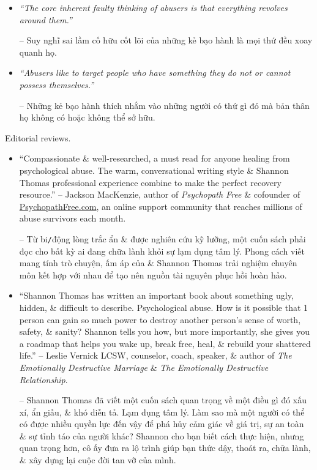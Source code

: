 \documentclass{article}
\begin{document}
\begin{enumerate}
\begin{itemize}
		\item {\it``The core inherent faulty thinking of abusers is that everything revolves around them.''}		
		
		-- Suy nghĩ sai lầm cố hữu cốt lõi của những kẻ bạo hành là mọi thứ đều xoay quanh họ.
		
		\item {\it``Abusers like to target people who have something they do not or cannot possess themselves.''}
		
		-- Những kẻ bạo hành thích nhắm vào những người có thứ gì đó mà bản thân họ không có hoặc không thể sở hữu.
	\end{itemize}
	{\sf Editorial reviews.}
	\begin{itemize}
		\item ``Compassionate \& well-researched, a must read for anyone healing from psychological abuse. The warm, conversational writing style \& {\sc Shannon Thomas} professional experience combine to make the perfect recovery resource.'' -- {\sc Jackson MacKenzie}, author of {\it Psychopath Free} \& cofounder of \url{PsychopathFree.com}, an online support community that reaches millions of abuse survivors each month.
		
		-- Từ bi{\tt/}động lòng trắc ẩn \& được nghiên cứu kỹ lưỡng, một cuốn sách phải đọc cho bất kỳ ai đang chữa lành khỏi sự lạm dụng tâm lý. Phong cách viết mang tính trò chuyện, ấm áp của \& {\sc Shannon Thomas} trải nghiệm chuyên môn kết hợp với nhau để tạo nên nguồn tài nguyên phục hồi hoàn hảo.
		
		\item ``{\sc Shannon Thomas} has written an important book about something ugly, hidden, \& difficult to describe. Psychological abuse. How is it possible that 1 person can gain so much power to destroy another person's sense of worth, safety, \& sanity? {\sc Shannon} tells you how, but more importantly, she gives you a roadmap that helps you wake up, break free, heal, \& rebuild your shattered life.'' -- {\sc Leslie Vernick LCSW}, counselor, coach, speaker, \& author of {\it The Emotionally Destructive Marriage} \& {\it The Emotionally Destructive Relationship}.
		
		-- {\sc Shannon Thomas} đã viết một cuốn sách quan trọng về một điều gì đó xấu xí, ẩn giấu, \& khó diễn tả. Lạm dụng tâm lý. Làm sao mà một người có thể có được nhiều quyền lực đến vậy để phá hủy cảm giác về giá trị, sự an toàn \& sự tỉnh táo của người khác? {\sc Shannon} cho bạn biết cách thực hiện, nhưng quan trọng hơn, cô ấy đưa ra lộ trình giúp bạn thức dậy, thoát ra, chữa lành, \& xây dựng lại cuộc đời tan vỡ của mình.
		

\end{itemize}
\end{enumerate}
\end{document}
